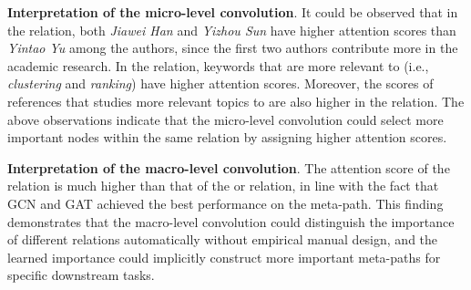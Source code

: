 \textbf{Interpretation of the micro-level convolution}.  
It could be observed that in the  relation, both \textit{Jiawei Han} and \textit{Yizhou Sun} have higher attention scores than \textit{Yintao Yu} among the authors, since the first two authors contribute more in the academic research. In the  relation, keywords that are more relevant to  (i.e., \textit{clustering} and \textit{ranking}) have higher attention scores. Moreover, the scores of references that studies more relevant topics to  are also higher in the  relation. The above observations indicate that the micro-level convolution could select more important nodes within the same relation by assigning higher attention scores. 

\textbf{Interpretation of the macro-level convolution}.
The attention score of the  relation is much higher than that of the  or  relation, in line with the fact that GCN and GAT achieved the best performance on the  meta-path. This finding demonstrates that the macro-level convolution could distinguish the importance of different relations automatically without empirical manual design, and the learned importance could implicitly construct more important meta-paths for specific downstream tasks.